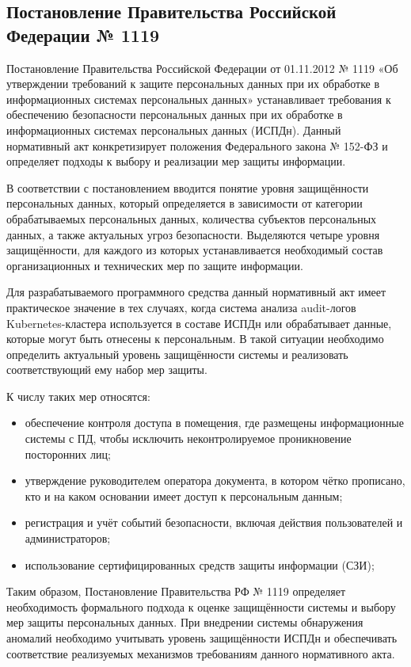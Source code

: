 \subsection{Постановление Правительства Российской Федерации № 1119}

Постановление Правительства Российской Федерации от 01.11.2012 № 1119 «Об утверждении требований к защите персональных данных при их обработке в информационных системах персональных данных» \cite{PP1119} устанавливает требования к обеспечению безопасности персональных данных при их обработке в информационных системах персональных данных (ИСПДн). Данный нормативный акт конкретизирует положения Федерального закона № 152-ФЗ и определяет подходы к выбору и реализации мер защиты информации.

В соответствии с постановлением вводится понятие уровня защищённости персональных данных, который определяется в зависимости от категории обрабатываемых персональных данных, количества субъектов персональных данных, а также актуальных угроз безопасности. Выделяются четыре уровня защищённости, для каждого из которых устанавливается необходимый состав организационных и технических мер по защите информации.

Для разрабатываемого программного средства данный нормативный акт имеет практическое значение в тех случаях, когда система анализа audit-логов Kubernetes-кластера используется в составе ИСПДн или обрабатывает данные, которые могут быть отнесены к персональным. В такой ситуации необходимо определить актуальный уровень защищённости системы и реализовать соответствующий ему набор мер защиты.

К числу таких мер относятся:
\begin{itemize}
    \item обеспечение контроля доступа в помещения, где размещены информационные системы с ПД, чтобы исключить неконтролируемое проникновение посторонних лиц;
    \item утверждение руководителем оператора документа, в котором чётко прописано, кто и на каком основании имеет доступ к персональным данным;
    \item регистрация и учёт событий безопасности, включая действия пользователей и администраторов;
    \item использование сертифицированных средств защиты информации (СЗИ);
\end{itemize}

Таким образом, Постановление Правительства РФ № 1119 определяет необходимость формального подхода к оценке защищённости системы и выбору мер защиты персональных данных. При внедрении системы обнаружения аномалий необходимо учитывать уровень защищённости ИСПДн и обеспечивать соответствие реализуемых механизмов требованиям данного нормативного акта.